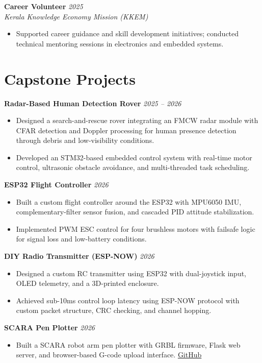 \documentclass[10pt,a4paper]{article}
\newcommand{\role}[2]{\textbf{#1} \hfill \textit{#2}}
\newcommand{\org}[2]{\textit{#1} \hfill #2}
\begin{document}
\role{Career Volunteer}{2025} \\
\org{Kerala Knowledge Economy Mission (KKEM)}{}
\begin{itemize}
    \item Supported career guidance and skill development initiatives; conducted technical mentoring sessions in electronics and embedded systems.
\end{itemize}

\section*{Capstone Projects}

\role{Radar-Based Human Detection Rover}{2025 -- 2026}
\begin{itemize}
    \item Designed a search-and-rescue rover integrating an FMCW radar module with CFAR detection and Doppler processing for human presence detection through debris and low-visibility conditions.
    \item Developed an STM32-based embedded control system with real-time motor control, ultrasonic obstacle avoidance, and multi-threaded task scheduling.
\end{itemize}

\role{ESP32 Flight Controller}{2026}
\begin{itemize}
    \item Built a custom flight controller around the ESP32 with MPU6050 IMU, complementary-filter sensor fusion, and cascaded PID attitude stabilization.
    \item Implemented PWM ESC control for four brushless motors with failsafe logic for signal loss and low-battery conditions.
\end{itemize}

\role{DIY Radio Transmitter (ESP-NOW)}{2026}
\begin{itemize}
    \item Designed a custom RC transmitter using ESP32 with dual-joystick input, OLED telemetry, and a 3D-printed enclosure.
    \item Achieved sub-10ms control loop latency using ESP-NOW protocol with custom packet structure, CRC checking, and channel hopping.
\end{itemize}

\role{SCARA Pen Plotter}{2026}
\begin{itemize}
    \item Built a SCARA robot arm pen plotter with GRBL firmware, Flask web server, and browser-based G-code upload interface. \href{https://github.com/vass112/scara-pen-plotter}{GitHub}
\end{itemize}
\end{document}
